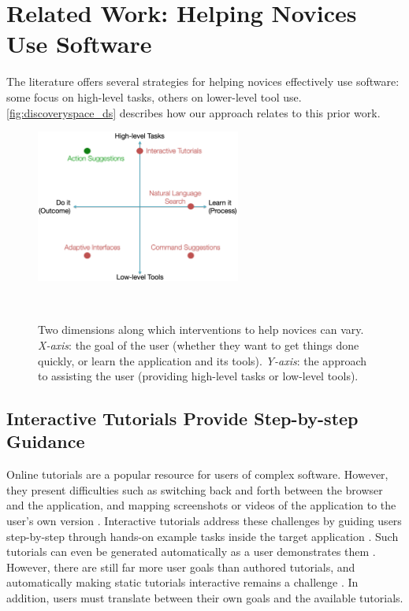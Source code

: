 \section{Related Work: Helping Novices Use Software}
The literature offers several strategies for helping novices effectively use software: some focus on high-level tasks, others on lower-level tool use. \autoref{fig:discoveryspace_ds} describes how our approach relates to this prior work. 

\begin{figure}[b!]
\centering
  \includegraphics[width=0.6\textwidth]{discoveryspace/figures/designspace.png}
  \caption{Two dimensions along which interventions to help novices can vary. \textit{X-axis}: the goal of the user (whether they want to get things done quickly, or learn the application and its tools). \textit{Y-axis}: the approach to assisting the user (providing high-level tasks or low-level tools).}~\label{fig:discoveryspace_ds}
\end{figure}

\subsection{Interactive Tutorials Provide Step-by-step Guidance}
Online tutorials are a popular resource for users of complex software. However, they present difficulties such as switching back and forth between the browser and the application, and mapping screenshots or videos of the application to the user's own version \cite{Kelleher2005, Pongnumkul2011}. Interactive tutorials address these challenges by guiding users step-by-step through hands-on example tasks inside the target application \cite{Kelleher2005, Lafreniere2014a, Pongnumkul2011}. Such tutorials can even be generated automatically as a user demonstrates them \cite{Grabler2009}. However, there are still far more user goals than authored tutorials, and automatically making static tutorials interactive remains a challenge \cite{Fourney2014Mining, Laput2012}. In addition, users must translate between their own goals and the available tutorials.

